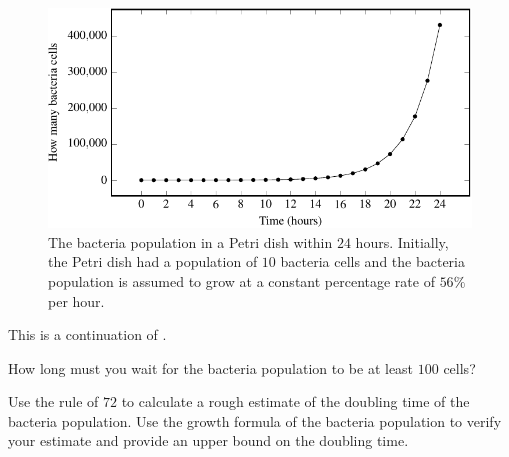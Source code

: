 \documentclass[a4paper,oneside,12pt]{article}
\begin{document}
\begin{figure}[!htbp]
\centering
\includegraphics[scale=1.1]{image/11/bacteria.pdf}
\caption{%
  The bacteria population in a Petri dish within $24$ hours.
  Initially, the Petri dish had a population of $10$ bacteria cells
  and the bacteria population is assumed to grow at a constant
  percentage rate of $56\%$ per hour.
}
\label{fig:exponential:bacteria_population_24_hours}
\end{figure}

\begin{exercise}
This is a continuation of .
\begin{packedenum}
\item\label{subex:exponential:bacteria_100_cells}
  How long must you wait for the bacteria population to be at least
  $100$ cells?

\item\label{subex:exponential:bacteria_doubling_time}
  Use the rule of $72$ to calculate a rough estimate of the doubling
  time of the bacteria population.  Use the growth formula of the
  bacteria population to verify your estimate and provide an upper
  bound on the doubling time.
\end{packedenum}
\end{exercise}
\end{document}
